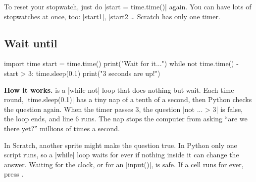 \begin{think}
To reset your stopwatch, just do \py|start = time.time()| again. You can have lots of stopwatches at once, too: \py|start1|, \py|start2|\ldots{} Scratch has only one timer.
\end{think}

\subsection*{Wait until}

\begin{tcbraster}[raster columns=2, raster equal height=rows, raster column skip=12pt, raster valign=center, raster force size=false, raster column 1/.style={width=0.36\linewidth}, raster column 2/.style={width=0.64\linewidth-12pt}]
\begin{tcolorbox}[colback=white, colframe=white, boxrule=0pt, valign=center, left=0pt, right=0pt]
\begin{scratch}
\end{scratch}
\end{tcolorbox}
\begin{code}
import time
start = time.time()
print("Wait for it...")
while not time.time() - start > 3:
    time.sleep(0.1)
print("3 seconds are up!")
\end{code}
\end{tcbraster}

\textbf{How it works.}  is a \py|while not| loop that does nothing but wait. Each time round, \py|time.sleep(0.1)| has a tiny nap of a tenth of a second, then Python checks the question again. When the timer passes 3, the question \py|not ... > 3| is false, the loop ends, and line 6 runs. The nap stops the computer from asking ``are we there yet?'' millions of times a second.

\begin{watchout}
In Scratch, another sprite might make the question true. In Python only one script runs, so a \py|while| loop waits for ever if nothing inside it can change the answer. Waiting for the clock, or for an \py|input()|, is safe. If a cell runs for ever, press \stopbtn.
\end{watchout}

